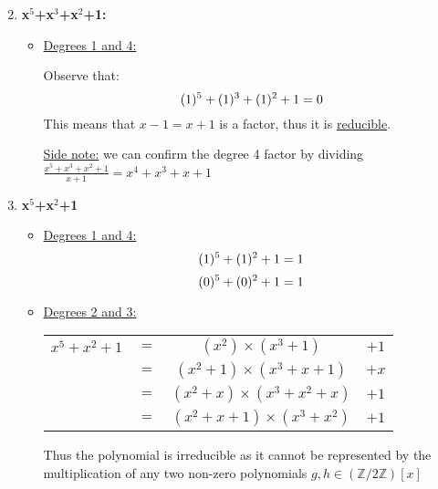 \documentclass{article}
\numberwithin{equation}{subsection}
\begin{document}
		\begin{enumerate}
			\setcounter{enumi}{1}
			\item \textbf{x$^5$+x$^3$+x$^2$+1:}
				\begin{itemize}
					\item \underline{Degrees 1 and 4:}

						Observe that:
						\begin{equation}\notag
							(1)^5+(1)^3+(1)^2+1 = 0
						\end{equation}
						This means that $x-1 = x+1$ is a factor, thus it is \underline{reducible}.

						\underline{Side note:} we can confirm the degree 4 factor by dividing $\frac{x^5+x^3+x^2+1}{x+1} = x^4+x^3+x+1$ 
				\end{itemize}
			
			\vspace{20pt}
			\item \textbf{x$^5$+x$^2$+1}
				\begin{itemize}
					\item \underline{Degrees 1 and 4:}
						\begin{equation}\notag
							(1)^5 + (1)^2 +1 = 1	
						\end{equation}
						\begin{equation}\notag
							(0)^5 + (0)^2 + 1 = 1	
						\end{equation}

				\item \underline{Degrees 2 and 3:}
				\begin{center}
					\begin{tabular}{c c c c}
						$x^5 + x^2 + 1$	&	$=$	&	$(x^2)\times (x^3+1)$ &	$+1$\\
														&	$=$	&	$(x^2+1)\times (x^3+x+1)$	&	$+x$\\
														&	$=$	&	$(x^2+x)\times (x^3+x^2+x)$	&	$+1$\\
														&	$=$	&	$(x^2+x+1)\times(x^3+x^2)$	&	$+1$
					\end{tabular}

				\end{center}	
				Thus the polynomial is irreducible as it cannot be represented by the multiplication of any two non-zero polynomials $g,h\in (\mathbb{Z}/2\mathbb{Z})[x]$
		\end{itemize}
		\end{enumerate}
	
	\newpage
	\thispagestyle{fancy}
\end{document}
